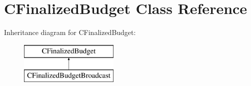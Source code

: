 \hypertarget{class_c_finalized_budget}{}\section{C\+Finalized\+Budget Class Reference}
\label{class_c_finalized_budget}
Inheritance diagram for C\+Finalized\+Budget\+:\begin{figure}[H]
\begin{center}
\leavevmode
\includegraphics[height=2.000000cm]{class_c_finalized_budget}
\end{center}
\end{figure}
